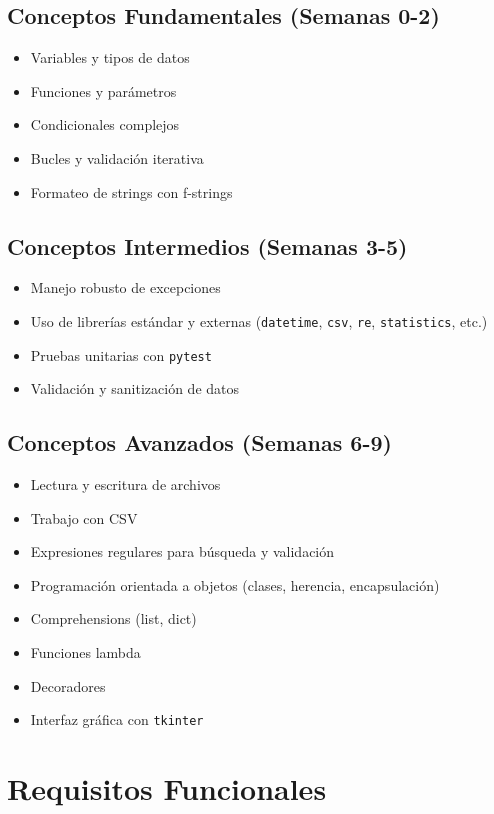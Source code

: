 \documentclass[12pt,a4paper]{article}
\begin{document}
\subsection{Conceptos Fundamentales (Semanas 0-2)}
\begin{itemize}[leftmargin=*]
    \item Variables y tipos de datos
    \item Funciones y parámetros
    \item Condicionales complejos
    \item Bucles y validación iterativa
    \item Formateo de strings con f-strings
\end{itemize}

\subsection{Conceptos Intermedios (Semanas 3-5)}
\begin{itemize}[leftmargin=*]
    \item Manejo robusto de excepciones
    \item Uso de librerías estándar y externas (\texttt{datetime}, \texttt{csv}, \texttt{re}, \texttt{statistics}, etc.)
    \item Pruebas unitarias con \texttt{pytest}
    \item Validación y sanitización de datos
\end{itemize}

\subsection{Conceptos Avanzados (Semanas 6-9)}
\begin{itemize}[leftmargin=*]
    \item Lectura y escritura de archivos
    \item Trabajo con CSV
    \item Expresiones regulares para búsqueda y validación
    \item Programación orientada a objetos (clases, herencia, encapsulación)
    \item Comprehensions (list, dict)
    \item Funciones lambda
    \item Decoradores
    \item Interfaz gráfica con \texttt{tkinter}
\end{itemize}

\section{Requisitos Funcionales}
\end{document}
